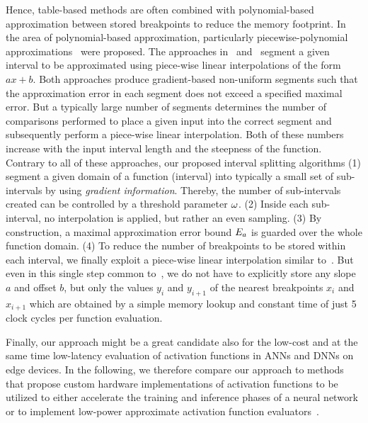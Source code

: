 Hence, table-based methods are often combined with polynomial-based approximation {between stored breakpoints to} reduce the memory footprint. 
{In the area of polynomial-based approximation, particularly} piecewise-polynomial approximations~\cite{Lee2009,Butler2011,Caro2011,Dong2014} {were proposed}.
{The approaches in}~\cite{Butler2011} and~\cite{Dong2014} segment a given interval to be approximated using piece-wise linear interpolations of the form {$ax + b$.} 
Both approaches produce gradient-based non-uniform segments such that the approximation error in each segment does not exceed a specified maximal error. 
{But a typically large} number of segments determines the number of comparisons performed to place a given input {into} the correct {segment and subsequently perform a piece-wise linear interpolation}. 
Both of these numbers increase with the input interval length and the steepness of the function.\\
{Contrary to all of these approaches, our proposed interval splitting algorithms} (1) segment a given domain of a function (interval) into typically a small set of sub-intervals by using {\em gradient information}. 
{Thereby, the number of sub-intervals created can be controlled by a threshold parameter $\omega$.}
{(2) Inside each sub-interval, no interpolation is applied, but rather an even sampling. 
(3) By construction, a maximal approximation error bound $E_a$ is guarded over the whole function domain.
(4) To reduce the number of breakpoints to be stored within each interval, we finally exploit a piece-wise linear interpolation similar to~\cite{Butler2011,Dong2014}. 
But even in this single step common to~\cite{Butler2011,Dong2014}}, we do not {have to explicitly} store any slope $a$ and offset $b$, but only the values $y_{i}$ and $y_{i+1}$ of the nearest {breakpoints $x_i$ and $x_{i+1}$ which are obtained by a simple memory lookup and constant time  of just 5 clock cycles per function evaluation.}\par
{Finally, our approach might be a great candidate also for the low-cost and at the same time low-latency evaluation of activation functions in \acp{ANN} and \acp{DNN} on edge devices. 
In the following,  we therefore compare our approach to methods that propose custom hardware implementations of activation functions to be utilized to either accelerate the training and inference phases of a neural network or to implement low-power approximate activation function evaluators~\cite{Dong:2021,Chang:2019,Yu:2022,Tao:2019}.}\par
